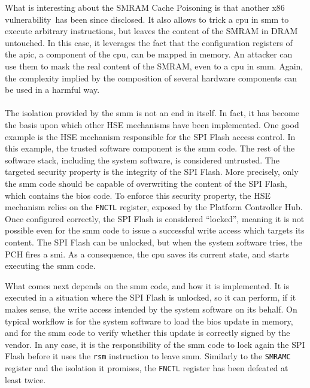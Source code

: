 What is interesting about the SMRAM Cache Poisoning is that another x86
vulnerability\,\cite{domas2015sinkhole} has been since disclosed.
%
It also allows to trick a \ac{cpu} in \ac{smm} to execute arbitrary
instructions, but leaves the content of the SMRAM in DRAM untouched.
%
In this case, it leverages the fact that the configuration registers of the
\ac{apic}, a component of the \ac{cpu}, can be mapped in memory.
%
An attacker can use them to mask the real content of the SMRAM, even to a
\ac{cpu} in \ac{smm}.
%
Again, the complexity implied by the composition of several hardware components
can be used in a harmful way.


\paragraph{}
%
The isolation provided by the \ac{smm} is not an end in itself.
%
In fact, it has become the basis upon which other HSE mechanisms have been
implemented.
%
One good example is the HSE mechanism responsible for the SPI Flash access
control.
%
In this example, the trusted software component is the \ac{smm} code.
%
The rest of the software stack, including the system software, is considered
untrusted.
%
The targeted security property is the integrity of the SPI Flash.
%
More precisely, only the \ac{smm} code should be capable of overwriting the
content of the SPI Flash, which contains the \ac{bios} code.
%
To enforce this security property, the HSE mechanism relies on the
\texttt{FNCTL}  register,
exposed by the Platform Controller Hub.
%
Once configured correctly, the SPI Flash is considered ``locked'', meaning it is
not possible even for the \ac{smm} code to issue a successful write access which
targets its content.
%
The SPI Flash can be unlocked, but when the system software tries, the PCH fires
a \ac{smi}.
%
As a consequence, the \ac{cpu} saves its current state, and starts executing the
\ac{smm} code.

What comes next depends on the \ac{smm} code, and how it is implemented.
%
It is executed in a situation where the SPI Flash is unlocked, so it can
perform, if it makes sense, the write access intended by the system software on
its behalf.
%
On typical workflow is for the system software to load the \ac{bios} update in
memory, and for the \ac{smm} code to verify whether this update is correctly
signed by the vendor.
%
In any case, it is the responsibility of the \ac{smm} code to lock again the SPI
Flash before it uses the \texttt{rsm} instruction to leave \ac{smm}.
%
Similarly to the \texttt{SMRAMC} register and the isolation it promises, the
\texttt{FNCTL} register has been defeated at least twice.

